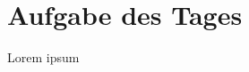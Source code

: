 \documentclass[]{article}
\begin{document}
    \section*{Aufgabe des Tages}
    Lorem ipsum
\end{document}
